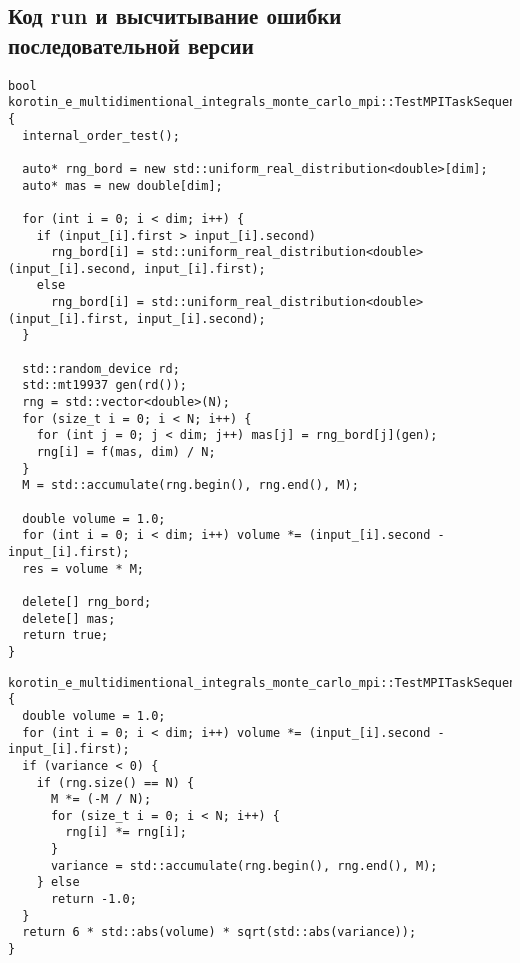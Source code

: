 \documentclass[a4paper,12pt]{article}
\begin{document}
\subsection{Код run и высчитывание ошибки последовательной версии}

\begin{lstlisting}[caption={run последовательной версии}, label=lst:mpi_code]
bool korotin_e_multidimentional_integrals_monte_carlo_mpi::TestMPITaskSequential::run() {
  internal_order_test();

  auto* rng_bord = new std::uniform_real_distribution<double>[dim];
  auto* mas = new double[dim];

  for (int i = 0; i < dim; i++) {
    if (input_[i].first > input_[i].second)
      rng_bord[i] = std::uniform_real_distribution<double>(input_[i].second, input_[i].first);
    else
      rng_bord[i] = std::uniform_real_distribution<double>(input_[i].first, input_[i].second);
  }

  std::random_device rd;
  std::mt19937 gen(rd());
  rng = std::vector<double>(N);
  for (size_t i = 0; i < N; i++) {
    for (int j = 0; j < dim; j++) mas[j] = rng_bord[j](gen);
    rng[i] = f(mas, dim) / N;
  }
  M = std::accumulate(rng.begin(), rng.end(), M);

  double volume = 1.0;
  for (int i = 0; i < dim; i++) volume *= (input_[i].second - input_[i].first);
  res = volume * M;

  delete[] rng_bord;
  delete[] mas;
  return true;
}
\end{lstlisting}

\begin{lstlisting}[caption={Првоерка корректности последовательной версии}, label=lst:mpi_code]
korotin_e_multidimentional_integrals_monte_carlo_mpi::TestMPITaskSequential::possible_error() {
  double volume = 1.0;
  for (int i = 0; i < dim; i++) volume *= (input_[i].second - input_[i].first);
  if (variance < 0) {
    if (rng.size() == N) {
      M *= (-M / N);
      for (size_t i = 0; i < N; i++) {
        rng[i] *= rng[i];
      }
      variance = std::accumulate(rng.begin(), rng.end(), M);
    } else
      return -1.0;
  }
  return 6 * std::abs(volume) * sqrt(std::abs(variance));
}
\end{lstlisting}
\end{document}
